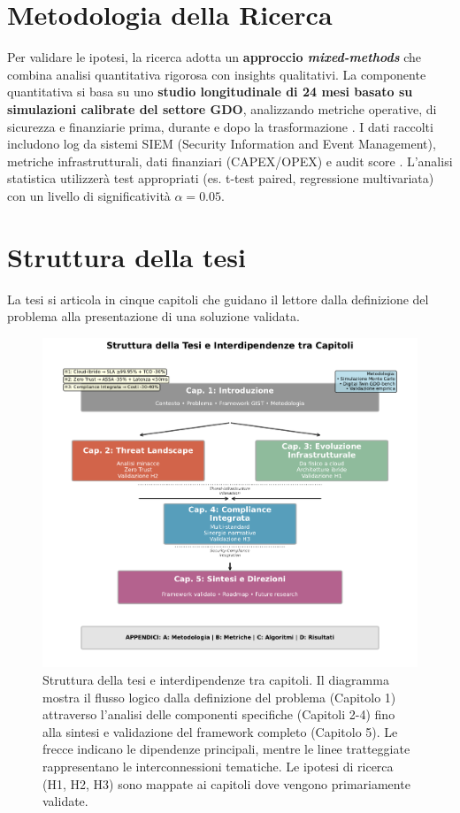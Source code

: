 \section{Metodologia della Ricerca}
Per validare le ipotesi, la ricerca adotta un  \textbf{approccio \textit{mixed-methods}} che combina analisi quantitativa rigorosa con insights qualitativi. La componente quantitativa si basa su uno
\textbf{studio longitudinale di 24 mesi basato su simulazioni calibrate del settore GDO}, analizzando metriche operative, di sicurezza e finanziarie prima, durante e dopo la trasformazione . I dati raccolti includono log da sistemi SIEM (Security Information and Event Management), metriche infrastrutturali, dati finanziari (CAPEX/OPEX) e audit score . L'analisi statistica utilizzerà test appropriati (es. t-test paired, regressione multivariata) con un livello di significatività $\alpha=0.05$.

\section{Struttura della tesi}
La tesi si articola in cinque capitoli che guidano il lettore dalla definizione del problema alla presentazione di una soluzione validata.

\begin{figure}[htbp]
\centering
\includegraphics[width=\textwidth]{thesis_figures/cap1/fig_1_4_thesis_structure.pdf}
\caption{Struttura della tesi e interdipendenze tra capitoli. Il diagramma mostra il flusso logico dalla definizione del problema (Capitolo 1) attraverso l'analisi delle componenti specifiche (Capitoli 2-4) fino alla sintesi e validazione del framework completo (Capitolo 5). Le frecce indicano le dipendenze principali, mentre le linee tratteggiate rappresentano le interconnessioni tematiche. Le ipotesi di ricerca (H1, H2, H3) sono mappate ai capitoli dove vengono primariamente validate.}
\label{fig:thesis_structure}
\end{figure}


